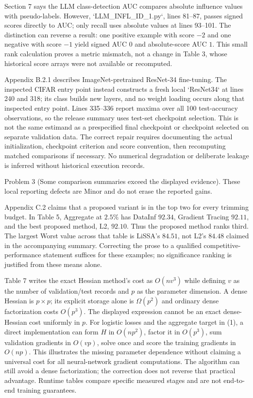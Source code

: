 \documentclass[10pt]{article}
\begin{document}
Section 7 says the LLM class-detection AUC compares absolute influence values with pseudo-labels. However, `LLM\_INFL\_ID\_1.py`, lines 81–87, passes signed scores directly to AUC; only recall uses absolute values at lines 93–101. The distinction can reverse a result: one positive example with score \(-2\) and one negative with score \(-1\) yield signed AUC \(0\) and absolute-score AUC \(1\). This small rank calculation proves a metric mismatch, not a change in Table 3, whose historical score arrays were not available or recomputed.\par
Appendix B.2.1 describes ImageNet-pretrained ResNet-34 fine-tuning. The inspected CIFAR entry point instead constructs a fresh local `ResNet34` at lines 240 and 318; its class builds new layers, and no weight loading occurs along that inspected entry point. Lines 335–336 report maxima over all 100 test-accuracy observations, so the release summary uses test-set checkpoint selection. This is not the same estimand as a prespecified final checkpoint or checkpoint selected on separate validation data. The correct repair requires documenting the actual initialization, checkpoint criterion and score convention, then recomputing matched comparisons if necessary. No numerical degradation or deliberate leakage is inferred without historical execution records.\par
Problem 3 (Some comparison summaries exceed the displayed evidence).  These local reporting defects are Minor and do not erase the reported gains.\par
Appendix C.2 claims that a proposed variant is in the top two for every trimming budget. In Table 5, Aggregate at \(2.5\%\) has DataInf \(92.34\), Gradient Tracing \(92.11\), and the best proposed method, L2, \(92.10\). Thus the proposed method ranks third. The largest Worst value across that table is LiSSA’s \(84.51\), not L2’s \(84.48\) claimed in the accompanying summary. Correcting the prose to a qualified competitive-performance statement suffices for these examples; no significance ranking is justified from these means alone.\par
Table 7 writes the exact Hessian method’s cost as \(O(nv^3)\) while defining \(v\) as the number of validation/test records and \(p\) as the parameter dimension. A dense Hessian is \(p\times p\); its explicit storage alone is \(\Omega(p^2)\) and ordinary dense factorization costs \(O(p^3)\). The displayed expression cannot be an exact dense-Hessian cost uniformly in \(p\). For logistic losses and the aggregate target in (1), a direct implementation can form \(H\) in \(O(np^2)\), factor it in \(O(p^3)\), sum validation gradients in \(O(vp)\), solve once and score the training gradients in \(O(np)\). This illustrates the missing parameter dependence without claiming a universal cost for all neural-network gradient computations. The algorithm can still avoid a dense factorization; the correction does not reverse that practical advantage. Runtime tables compare specific measured stages and are not end-to-end training guarantees.\par
\end{document}
